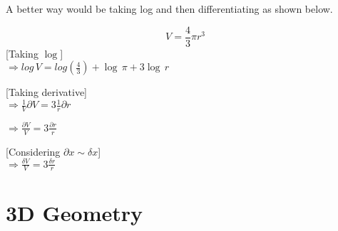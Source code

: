 \documentclass[12pt]{article}
\begin{document}
\begin{notes}
A better way would be taking log and then differentiating as shown below.
\vspace{0.3cm}
\begin{tcolorbox}
\[V = \frac{4}{3}\pi r^3\]
[Taking $\log$] \\
$\Rightarrow log\,V = log(\frac{4}{3})+\log\,\pi+3\log\,r$
\vspace{0.3cm}

[Taking derivative] \\
$\Rightarrow \frac{1}{V}\partial V = 3\frac{1}{r}\partial r$ 
\vspace{0.15cm}

$\Rightarrow \frac{\partial V}{V} = 3\frac{\partial r}{r}$
\vspace{0.3cm}

[Considering $\partial x \sim  \delta x$] \\
$\Rightarrow \frac{\delta V}{V} = 3\frac{\delta r}{r}$
\end{tcolorbox}
\end{notes}
\newpage

\section{3D Geometry}
\end{document}
